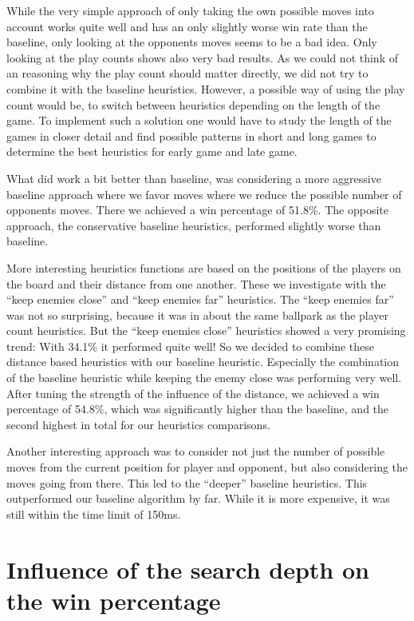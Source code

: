 \documentclass[aps,prd,notitlepage,floatfix,superscriptaddress,groupedaddress,nofootinbib]{revtex4-1}
\begin{document}
While the very simple approach of only taking the own possible moves into account works quite well and has an only slightly worse win rate than the baseline, only looking at the opponents moves seems to be a bad idea. Only looking at the play counts shows also very bad results. As we could not think of an reasoning why the play count should matter directly, we did not try to combine it with the baseline heuristics. However, a possible way of using the play count would be, to switch between heuristics depending on the length of the game. To implement such a solution one would have to study the length of the games in closer detail and find possible patterns in short and long games to determine the best heuristics for early game and late game.

What did work a bit better than baseline, was considering a more aggressive baseline approach where we favor moves where we reduce the possible number of opponents moves. There we achieved a win percentage of 51.8\%. The opposite approach, the conservative baseline heuristics, performed slightly worse than baseline.

More interesting heuristics functions are based on the positions of the players on the board and their distance from one another. These we investigate with the ``keep enemies close'' and ``keep enemies far'' heuristics. The ``keep enemies far'' was not so surprising, because it was in about the same ballpark as the player count heuristics. But the ``keep enemies close'' heuristics showed a very promising trend: With 34.1\% it performed quite well! So we decided to combine these distance based heuristics with our baseline heuristic. Especially the combination of the baseline heuristic while keeping the enemy close was performing very well. After tuning the strength of the influence of the distance, we achieved a win percentage of 54.8\%, which was significantly higher than the baseline, and the second highest in total for our heuristics comparisons.

Another interesting approach was to consider not just the number of possible moves from the current position for player and opponent, but also considering the moves going from there. This led to the ``deeper'' baseline heuristics. This outperformed our baseline algorithm by far. While it is more expensive, it was still within the time limit of 150ms.

\section{\label{sec:search_depth}Influence of the search depth on the win percentage}
\end{document}
